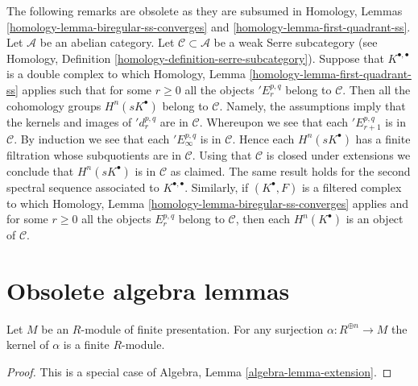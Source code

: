 \begin{remark}
\label{remark-weak-serre-subcategory}
The following remarks are obsolete as they are subsumed in
Homology, Lemmas \ref{homology-lemma-biregular-ss-converges} and
\ref{homology-lemma-first-quadrant-ss}.
Let $\mathcal{A}$ be an abelian category.
Let $\mathcal{C} \subset \mathcal{A}$
be a weak Serre subcategory (see
Homology, Definition \ref{homology-definition-serre-subcategory}).
Suppose that $K^{\bullet, \bullet}$ is a double complex to which
Homology, Lemma \ref{homology-lemma-first-quadrant-ss}
applies such that for some $r \geq 0$ all the objects
${}'E_r^{p, q}$ belong to $\mathcal{C}$. Then all the cohomology groups
$H^n(sK^\bullet)$ belong to $\mathcal{C}$. Namely, the assumptions imply
that the kernels and images of ${}'d_r^{p, q}$ are in $\mathcal{C}$.
Whereupon we see that each ${}'E_{r + 1}^{p, q}$ is in $\mathcal{C}$.
By induction we see that each ${}'E_\infty^{p, q}$ is in $\mathcal{C}$.
Hence each $H^n(sK^\bullet)$ has a finite filtration whose subquotients
are in $\mathcal{C}$. Using that $\mathcal{C}$ is closed under extensions
we conclude that $H^n(sK^\bullet)$ is in $\mathcal{C}$ as claimed.
The same result holds for the second spectral sequence associated
to $K^{\bullet, \bullet}$. Similarly, if $(K^\bullet, F)$ is a filtered
complex to which
Homology, Lemma \ref{homology-lemma-biregular-ss-converges}
applies and for some $r \geq 0$ all the objects $E_r^{p, q}$
belong to $\mathcal{C}$, then each $H^n(K^\bullet)$ is
an object of $\mathcal{C}$.
\end{remark}




\section{Obsolete algebra lemmas}
\label{section-algebra}

\begin{lemma}
\label{lemma-finite-presentation-module-independent}
Let $M$ be an $R$-module of finite presentation.
For any surjection $\alpha : R^{\oplus n} \to M$ the
kernel of $\alpha$ is a finite $R$-module.
\end{lemma}

\begin{proof}
This is a special case of Algebra, Lemma \ref{algebra-lemma-extension}.
\end{proof}

